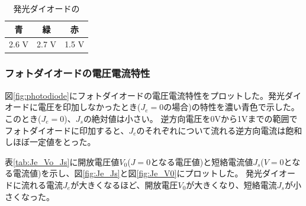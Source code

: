 \documentclass[11pt,a4]{jarticle}
\begin{document}
\begin{table}[!htbp]
   \begin{center}
  \begin{tabular}{ccc}
    青 & 緑 & 赤\\ \hline
    2.6 V & 2.7 V & 1.5 V\\
  \end{tabular}
  \label{tab:photodiode}
     \end{center}
       \caption{発光ダイオードの}
\end{table}

\subsubsection{フォトダイオードの電圧電流特性}
図\ref{fig:photodiode}にフォトダイオードの電圧電流特性をプロットした。発光ダイオードに電圧を印加しなかったとき($J_e=0$の場合)の特性を濃い青色で示した。
このとき($J_e=0$)、$J_s$の絶対値は小さい。
逆方向電圧を0Vから1Vまでの範囲でフォトダイオードに印加すると、$J_e$のそれぞれについて流れる逆方向電流は飽和しほぼ一定値をとった。


表\ref{tab:Je_Vo_Js}に開放電圧値$V_0$($J=0$となる電圧値)と短絡電流値$J_s$($V=0$となる電流値)を示し、図\ref{fig:Je_Js}と図\ref{fig:Je_V0}にプロットした。
発光ダイオードに流れる電流$J_e$が大きくなるほど、開放電圧$V_0$が大きくなり、短絡電流$J_s$が小さくなった。
\end{document}
